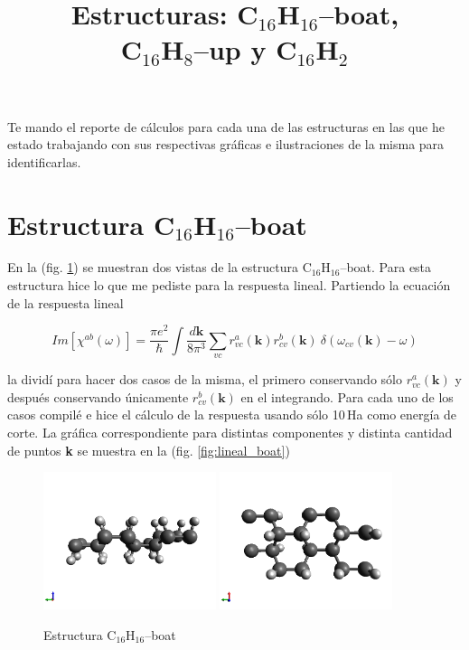 \documentclass[11pt]{article}
\title{ Estructuras: C$_{16}$H$_{16}$--boat, \\ C$_{16}$H$_{8}$--up  y  C$_{16}$H$_{2}$ }
\date{}
\begin{document}
\maketitle
\thispagestyle{empty}


\vspace{.5cm}

Te mando el reporte de c\'alculos para cada una de las estructuras en las que he estado trabajando con sus respectivas gr\'aficas e ilustraciones de la misma para identificarlas.

\section{Estructura C$_{16}$H$_{16}$--boat}

En la (fig. \ref{fig:boat}) se muestran dos vistas de la estructura C$_{16}$H$_{16}$--boat. Para esta estructura hice lo que me pediste para la respuesta lineal. Partiendo la ecuaci\'on de la respuesta lineal

\begin{equation}
	Im \left[ \chi^{ab}(\omega) \right] = \frac{\pi e^{2}}{\hbar} \int \frac{d \textbf{k}}{8 \pi^{3}} \sum_{vc} r^{a}_{vc}(\textbf{k}) r^{b}_{cv}(\textbf{k}) \ \delta (\omega_{cv}(\textbf{k}) -\omega) \label{eqn:lineal}
\end{equation}

la divid\'i para hacer dos casos de la misma, el primero conservando s\'olo $r^{a}_{vc}(\textbf{k})$ y despu\'es conservando \'unicamente $r^{b}_{cv}(\textbf{k})$ en el integrando. Para cada uno de los casos compil\'e e hice el c\'alculo de la respuesta usando s\'olo 10\,Ha como energ\'ia de corte. La gr\'afica correspondiente para distintas componentes y distinta cantidad de puntos \textbf{k} se muestra en la (fig. \ref{fig:lineal_boat}) 

\begin{figure}[h!]
	\begin{center}
		\includegraphics[width=0.45\textwidth]{./figures/boat/c16h16-boat-structure1}
		\includegraphics[width=0.45\textwidth]{./figures/boat/c16h16-boat-structure2}
	\end{center}
	\caption{Estructura C$_{16}$H$_{16}$--boat}
	\label{fig:boat}
\end{figure}
\end{document}
